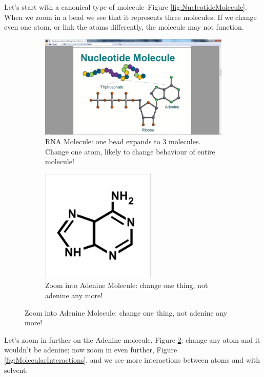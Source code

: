 \documentclass[]{article}
\begin{document}
Let's start with a canonical type of molecule--Figure \ref{fig:NucleotideMolecule}. When we zoom in a bead we see that it represents three molecules. If we change even one atom, or link the atoms differently, the molecule may not function.
\begin{figure}[H]
	\caption{Nucleotide Molecule }\label{fig:NucleotideMolecule}
	
	\begin{subfigure}[b]{0.45\textwidth}
		\centering
		\caption{RNA Molecule: one bead expands to 3 molecules. Change one atom, likely to change behaviour of entire molecule!}
		\includegraphics[width=\textwidth]{NucleotideMolecule}
	\end{subfigure}
	\begin{subfigure}[b]{0.45\textwidth}
		\centering
		\caption{Zoom into Adenine Molecule: change one thing, not adenine any more!}\label{fig:adenine}
		\includegraphics[width=0.6\textwidth]{AdenineMolecule}
	\end{subfigure}
\end{figure}

Let's zoom in further on the Adenine molecule, Figure \ref{fig:adenine}: change any atom and it wouldn't be adenine; now zoom in even further, Figure \ref{fig:MolecularInteractions}, and we see more interactions between atoms and with solvent.
\end{document}
